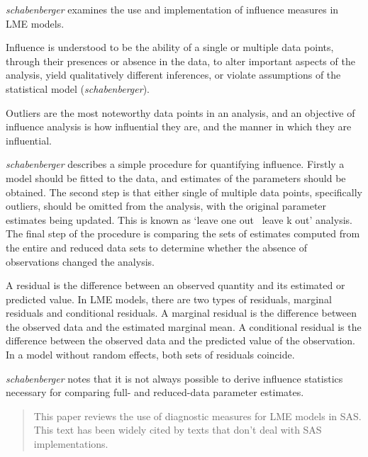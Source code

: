 \documentclass[Main.tex]{subfiles}
\begin{document}
	
	
	\textit{schabenberger} examines the use and implementation of
	influence measures in LME models.
	
	Influence is understood to be the ability of a single or multiple
	data points, through their presences or absence in the data, to
	alter important aspects of the analysis, yield qualitatively
	different inferences, or violate assumptions of the statistical
	model (\textit{schabenberger}).
	
	Outliers are the most noteworthy data points in an analysis, and
	an objective of influence analysis is how influential they are,
	and the manner in which they are influential.
	
	\textit{schabenberger} describes a simple procedure for quantifying
	influence. Firstly a model should be fitted to the data, and
	estimates of the parameters should be obtained. The second step is
	that either single of multiple data points, specifically outliers,
	should be omitted from the analysis, with the original parameter
	estimates being updated. This is known as `leave one out \ leave k
	out' analysis. The final step of the procedure is comparing the
	sets of estimates computed from the entire and reduced data sets
	to determine whether the absence of observations changed the
	analysis.
	
	
	
	A residual is the difference between an observed quantity and its
	estimated or predicted value. In LME models, there are two types
	of residuals, marginal residuals and conditional residuals. A
	marginal residual is the difference between the observed data and
	the estimated marginal mean. A conditional residual is the
	difference between the observed data and the predicted value of
	the observation. In a model without random effects, both sets of
	residuals coincide.
	
	\textit{schabenberger} notes that it is not always possible to
	derive influence statistics necessary for comparing full- and
	reduced-data parameter estimates. 
	
	
	\begin{abstract}
		\noindent This paper reviews the use of diagnostic measures for LME models in SAS. This text has been widely cited by texts that don't deal with SAS implementations.
	\end{abstract}
	
\end{document}
